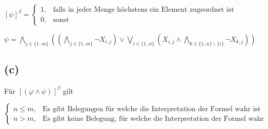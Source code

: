 \documentclass[12pt,a4paper]{scrartcl}
\begin{document}
$[\psi]^{\beta} = 
\begin{cases}
1, & {\textrm{falls in jeder Menge höchstens ein Element zugeordnet ist}}\\
0, & {\textrm{sonst}}
\end{cases}
$

$\psi = \bigwedge_{j \in \{1..m\}}(
(\bigwedge_{j \in \{1..m\}} \neg X_{i,j}) \vee
\bigvee_{i \in \{1..n\}}(X_{i,j} \wedge \bigwedge_{k \in \{1..n\} \backslash \{i\}} \neg X_{k,j})
)$

\subsection*{(c)}

Für $[(\varphi \wedge \psi)]^{\beta}$ gilt

$
\begin{cases}
n \leq m, & {\textrm{Es gibt Belegungen für welche die Interpretation der Formel wahr ist}}\\
n > m, & {\textrm{Es gibt keine Belegung, für welche die Interpretation der Formel wahr ist}}
\end{cases}
$
\end{document}
